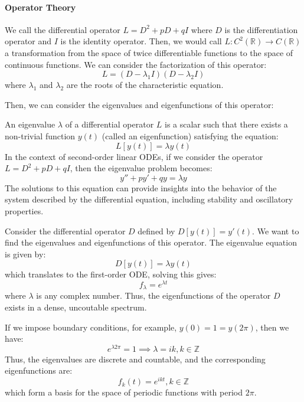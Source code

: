 \documentclass[11pt]{article}
\begin{document}
\paragraph{Operator Theory} We call the differential operator \( L = D^2 + pD + qI \) where \( D \) is the differentiation operator and \( I \) is the identity operator. Then, we would call $L: C^2(\mathbb{R}) \to C(\mathbb{R})$ a transformation from the space of twice differentiable functions to the space of continuous functions. We can consider the factorization of this operator:
$$L = (D - \lambda_1 I)(D - \lambda_2 I)$$
where \( \lambda_1 \) and \( \lambda_2 \) are the roots of the characteristic equation.

 
Then, we can consider the eigenvalues and eigenfunctions of this operator:
\begin{definition}
    An eigenvalue \( \lambda \) of a differential operator \( L \) is a scalar such that there exists a non-trivial function \( y(t) \) (called an eigenfunction) satisfying the equation:
    \begin{equation}
    L[y(t)] = \lambda y(t)
    \end{equation}
    In the context of second-order linear ODEs, if we consider the operator \( L = D^2 + pD + qI \), then the eigenvalue problem becomes:
    \begin{equation}
    y'' + py' + qy = \lambda y
    \end{equation}
    The solutions to this equation can provide insights into the behavior of the system described by the differential equation, including stability and oscillatory properties.
\end{definition}

\begin{example}[Eigenfunctions of $D$]
    Consider the differential operator \( D \) defined by \( D[y(t)] = y'(t) \). We want to find the eigenvalues and eigenfunctions of this operator. The eigenvalue equation is given by:
    $$D[y(t)] = \lambda y(t)$$
    which translates to the first-order ODE, solving this gives:
    $$ f_\lambda = e^{\lambda t} $$
    where \( \lambda \) is any complex number. Thus, the eigenfunctions of the operator \( D \) exists in a dense, uncoutable spectrum.
    
    If we impose boundary conditions, for example, \( y(0) = 1 = y(2\pi) \), then we have:
    $$ e^{\lambda 2\pi} = 1 \implies \lambda = ik, k \in \mathbb{Z} $$
    Thus, the eigenvalues are discrete and countable, and the corresponding eigenfunctions are:
    $$ f_k(t) = e^{ikt}, k \in \mathbb{Z} $$
    which form a basis for the space of periodic functions with period \( 2\pi \).
\end{example}
\end{document}
